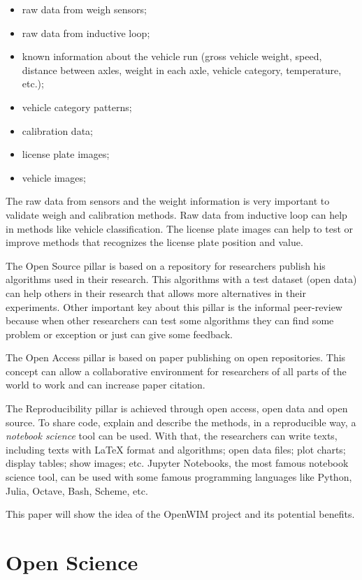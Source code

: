 \documentclass[a4paper]{article}
\begin{document}
{\begin{itemize}
\item raw data from weigh sensors;
\item raw data from inductive loop;
\item known information about the vehicle run (gross vehicle weight, speed, distance between axles, weight in each axle, vehicle category, temperature, etc.);
\item vehicle category patterns;
\item calibration data;
\item license plate images;
\item vehicle images;
\end{itemize}

The raw data from sensors and the weight information is very important to validate weigh and calibration methods. Raw data from inductive loop can help in methods like vehicle classification. The license plate images can help to test or improve methods that recognizes the license plate position and value.

The Open Source pillar is based on a repository for researchers publish his algorithms used in their research. This algorithms with a test dataset (open data) can help others in their research that allows more alternatives in their experiments. Other important key about this pillar is the informal peer-review because when other researchers can test some algorithms they can find some problem or exception or just can give some feedback.

The Open Access pillar is based on paper publishing on open repositories. This concept can allow a collaborative environment for researchers of all parts of the world to work and can increase paper citation.

The Reproducibility pillar is achieved through open access, open data and open source. To share code, explain and describe the methods, in a reproducible way, a \textit{notebook science} tool can be used. With that, the researchers can write texts, including texts with LaTeX format and algorithms; open data files; plot charts; display tables; show images; etc. Jupyter Notebooks, the most famous notebook science tool, can be used with some famous programming languages like Python, Julia, Octave, Bash, Scheme, etc.

This paper will show the idea of the OpenWIM project and its potential benefits.

\section{Open Science}\label{open-science}

}
\end{document}

